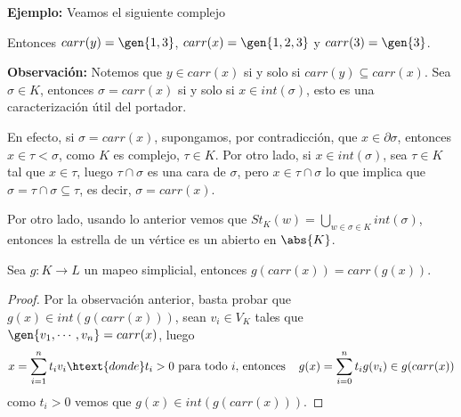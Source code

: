 \documentclass{article}
\begin{document}
\vspace{2mm}
\noindent\textbf{Ejemplo:} Veamos el siguiente complejo
\begin{center}
\end{center}
Entonces $carr(y)=\gen{1,3}$, $carr(x)=\gen{1,2,3}$ y $carr(3)=\gen{3}$.

\vspace{2mm}
\noindent\textbf{Observación:} Notemos que $y\in carr(x)$ si y solo si $carr(y)\subseteq carr(x)$.
Sea $\sigma\in K$, entonces $\sigma=carr(x)$ si y solo si $x\in int(\sigma)$, esto es una 
caracterización útil del portador.

\vspace{2mm}
\noindent En efecto, si $\sigma=carr(x)$, supongamos, por contradicción, que $x\in\partial\sigma$,
entonces $x\in\tau<\sigma$, como $K$ es complejo, $\tau\in K$. Por otro lado, si 
$x\in int(\sigma)$, sea $\tau\in K$ tal que $x\in\tau$, luego $\tau\cap\sigma$ es una cara de 
$\sigma$, pero $x\in\tau\cap\sigma$ lo que implica que $\sigma=\tau\cap\sigma\subseteq\tau$, es
decir, $\sigma=carr(x)$.

\noindent Por otro lado, usando lo anterior vemos que $St_{K}(w)=\bigcup_{w\in\sigma\in K}
int(\sigma)$, entonces la estrella de un vértice es un abierto en $\abs{K}$.

\vspace{2mm}
\begin{prop}
    Sea $g:K\to L$ un mapeo simplicial, entonces $g(carr(x))=carr(g(x))$.
\end{prop}
\begin{proof}
    Por la observación anterior, basta probar que $g(x)\in int(g(carr(x)))$, sean $v_{i}\in V_{K}$
    tales que $\gen{v_{1},\cdots,v_{n}}=carr(x)$, luego
    \begin{equation*}
        x=\sum_{i=1}^{n}t_{i}v_{i}\htext{donde}t_{i}>0\text{ para todo }i\text{, entonces}
        \hspace{4mm}g(x)=\sum_{i=0}^{n}t_{i}g(v_{i})\in g(carr(x))
    \end{equation*}
    como $t_{i}>0$ vemos que $g(x)\in int(g(carr(x)))$.
\end{proof}
\end{document}
